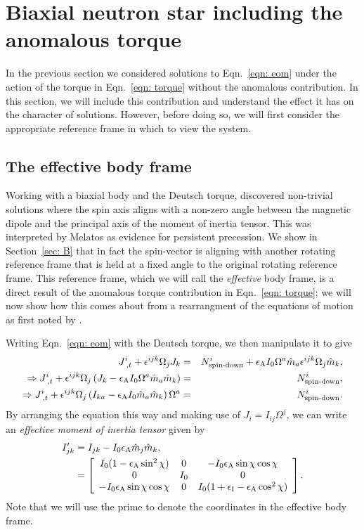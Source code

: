 \documentclass[../full_thesis/full_thesis.tex]{subfiles}
\begin{document}
\section{Biaxial neutron star including the anomalous torque}
\label{sec: biaxial neutron star with anomalous torque}
In the previous section we considered solutions to Eqn.~\eqref{eqn: eom}
under the action of the torque in Eqn.~\eqref{eqn: torque} without the
anomalous contribution. In this section, we will include this contribution and
understand the effect it has on the character of solutions. However, before
doing so, we will first consider the appropriate reference frame in which to
view the system.

\subsection{The effective body frame}
\label{sec: effective body frame}
Working with a biaxial body and the Deutsch torque, \cite{Melatos2000}
discovered non-trivial solutions where the spin axis aligns with a non-zero
angle between the magnetic dipole and the principal axis of the moment of
inertia tensor.  This was
interpreted by Melatos as evidence for persistent precession. We show in
Section~\ref{sec: B} that in fact the spin-vector is aligning with another
rotating reference frame that is held at a fixed angle to the original rotating
reference frame. This reference frame, which we will call the \emph{effective} body
frame, is a direct result of the anomalous torque contribution in
Eqn.~\eqref{eqn: torque}; we will now show how this comes about from a
rearrangment of the equations of motion as first noted by \citet{Glampedakis2010}.

Writing Eqn.~\eqref{eqn: eom} with the Deutsch torque, we then manipulate it to
give
\begin{eqnarray}
J^{i}_{\;,t}+\epsilon^{ijk}\Omega_{j}J_{k} & =
& N^{i}_{\textrm{spin-down}}+
\epsilon_{\mathrm{A}} I_{0}\Omega^{a}\hat{m}_{a}\epsilon^{ijk}\Omega_{j}\hat{m}_{k}, \\
\Rightarrow J^{i}_{\;,t}+
\epsilon^{ijk}\Omega_{j}\left(J_{k}-\epsilon_{\mathrm{A}} I_{0}\Omega^{a}\hat{m}_{a}\hat{m}_{k}\right)
& = & N^{i}_{\textrm{spin-down}}, \\
\Rightarrow J^{i}_{\;,t}+
\epsilon^{ijk}\Omega_{j}\left(I_{ka}-\epsilon_{\mathrm{A}} I_{0}\hat{m}_{a}\hat{m}_{k}\right)\Omega^{a}
& = & N^{i}_{\textrm{spin-down}}.
\end{eqnarray}
By arranging the equation this way and making use of $J_{i}=I_{ij}\Omega^{j}$,
we can write an \emph{effective moment of inertia tensor} given by
\begin{align}
I'_{jk}&=I_{jk}-I_{0}\epsilon_{\mathrm{A}}\hat{m}_{j}\hat{m}_{k}, \\
&= \left[
\begin{array}{ccc}
I_{0}(1-\epsilon_{\mathrm{A}}\sin^{2}\chi) & 0 & -I_{0}\epsilon_{\mathrm{A}}\sin\chi \cos \chi \\
0 & I_{0} & 0 \\  -I_{0}\epsilon_{\mathrm{A}}\sin\chi \cos \chi& 0 &
I_{0}(1+\epsilon_{\mathrm{I}}-\epsilon_{\mathrm{A}}\cos^{2}\chi)
\end{array}
\right].
\label{eqn: effective MOI}
\end{align}
Note that we will use the prime to denote the coordinates in the
effective body frame.
\end{document}
